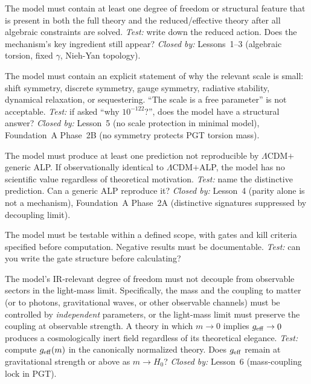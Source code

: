 \documentclass[aps,prd,twocolumn,superscriptaddress,showpacs,preprintnumbers,
  nofootinbib,longbibliography,floatfix]{revtex4-2}
\newcommand{\BI}{\gamma}
\begin{document}
\begin{description}[style=nextline,leftmargin=1em]
  \item[DR1: Survives reduction without washing out.]
    The model must contain at least one degree of freedom or structural
    feature that is present in both the full theory and the
    reduced/effective theory after all algebraic constraints are solved.
    \textit{Test:} write down the reduced action. Does the mechanism's key
    ingredient still appear?
    \textit{Closed by:} Lessons~1--3 (algebraic torsion, fixed $\BI$,
    Nieh-Yan topology).

  \item[DR2: Addresses tiny-scale naturalness explicitly.]
    The model must contain an explicit statement of why the relevant scale
    is small: shift symmetry, discrete symmetry, gauge symmetry, radiative
    stability, dynamical relaxation, or sequestering. ``The scale is a
    free parameter'' is not acceptable.
    \textit{Test:} if asked ``why $10^{-122}$?'', does the model have a
    structural answer?
    \textit{Closed by:} Lesson~5 (no scale protection in minimal model),
    Foundation~A Phase~2B (no symmetry protects PGT torsion mass).

  \item[DR3: Offers unique mechanism or distinctive observable.]
    The model must produce at least one prediction not reproducible by
    $\Lambda$CDM$+$generic ALP. If observationally identical to
    $\Lambda$CDM$+$ALP, the model has no scientific value regardless of
    theoretical motivation.
    \textit{Test:} name the distinctive prediction. Can a generic ALP
    reproduce it?
    \textit{Closed by:} Lesson~4 (parity alone is not a mechanism),
    Foundation~A Phase~2A (distinctive signatures suppressed by
    decoupling limit).

  \item[DR4: Fails cleanly if it doesn't work.]
    The model must be testable within a defined scope, with gates and kill
    criteria specified before computation. Negative results must be
    documentable.
    \textit{Test:} can you write the gate structure before calculating?

  \item[DR5: Avoids the mass-coupling lock.]
    The model's IR-relevant degree of freedom must not decouple from
    observable sectors in the light-mass limit. Specifically, the mass
    and the coupling to matter (or to photons, gravitational waves, or
    other observable channels) must be controlled by \textit{independent}
    parameters, or the light-mass limit must preserve the coupling at
    observable strength. A theory in which $m \to 0$ implies $g_{\rm eff}
    \to 0$ produces a cosmologically inert field regardless of its
    theoretical elegance.
    \textit{Test:} compute $g_{\rm eff}(m)$ in the canonically normalized
    theory. Does $g_{\rm eff}$ remain at gravitational strength or above
    as $m \to H_0$?
    \textit{Closed by:} Lesson~6 (mass-coupling lock in PGT).
\end{description}
\end{document}
